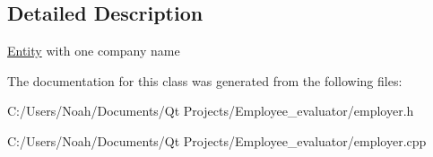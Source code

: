 \subsection{Detailed Description}
\hyperlink{class_entity}{Entity} with one company name 

The documentation for this class was generated from the following files\-:\begin{DoxyCompactItemize}
\item 
C\-:/\-Users/\-Noah/\-Documents/\-Qt Projects/\-Employee\-\_\-evaluator/employer.\-h\item 
C\-:/\-Users/\-Noah/\-Documents/\-Qt Projects/\-Employee\-\_\-evaluator/employer.\-cpp\end{DoxyCompactItemize}
